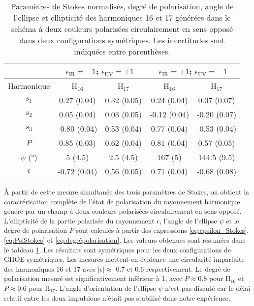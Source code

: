 \begin{table}[ht]
\centering
\begin{tabular}{|c||c|c|c|c|}
\hline
 & \multicolumn{2}{c|}{$\epsilon_{\text{IR}} = -1$; $\epsilon_{\text{UV}} = +1$} &  \multicolumn{2}{c|}{$\epsilon_{\text{IR}} = +1$; $\epsilon_{\text{UV}} = -1$} \\
\hline
Harmonique & H$_{16}$ & H$_{17}$ & H$_{16}$ & H$_{17}$ \\
\hline
$s_1$ & 0.27 (0.04) & 0.32 (0.05) & 0.24 (0.04) & 0.07 (0.07) \\
\hline
$s_2$ & 0.05 (0.04) & 0.03 (0.05) & -0.12 (0.04) & -0.20 (0.07) \\
\hline
$s_3$ & -0.80 (0.04) & 0.53 (0.04) & 0.77 (0.04) & -0.53 (0.04) \\
\hline
$P$ & 0.85 (0.03) & 0.62 (0.04) & 0.81 (0.04) & 0.57 (0.05) \\
\hline
$\psi$ (°) & 5 (4.5) & 2.5 (4.5) & 167 (5) & 144.5 (9.5) \\
\hline
$\epsilon$ & -0.72 (0.04) & 0.56 (0.05) & 0.71 (0.04) & -0.68 (0.08) \\
\hline
\end{tabular}
\caption{Paramètres de Stokes normalisés, degré de polarisation, angle de l'ellipse et ellipticité des harmoniques 16 et 17 générées dans le schéma à deux couleurs polarisées circulairement en sens opposé dans deux configurations symétriques. Les incertitudes sont indiquées entre parenthèses.}
\label{tab:resultatspm1}
\end{table}

\`{A} partir de cette mesure simultanée des trois paramètres de Stokes, on obtient la caractérisation complète de l'état de polarisation du rayonnement harmonique généré par un champ à deux couleurs polarisées circulairement en sens opposé. L'ellipticité de la partie polarisée du rayonnement $\epsilon$, l'angle de l'ellipse $\psi$ et le degré de polarisation $P$ sont calculés à partir des expressions \ref{eq:epsilon_Stokes}, \ref{eq:PsiStokes} et \ref{eq:degrépolarisation}. Les valeurs obtenues sont résumées dans le tableau \ref{tab:resultatspm1}. Les résultats sont symétriques pour les deux configurations de GHOE symétriques. Les mesures mettent en évidence une circularité imparfaite des harmoniques 16 et 17 avec $|\epsilon| \approx$ 0.7 et 0.6 respectivement. Le degré de polarisation mesuré est significativement inférieur à 1, avec $P \approx 0.8$ pour H$_{16}$ et $P \approx 0.6$ pour H$_{17}$. L'angle d'orientation de l'ellipse $\psi$ n'est pas discuté car le délai relatif entre les deux impulsions n'était pas stabilisé dans notre expérience.

